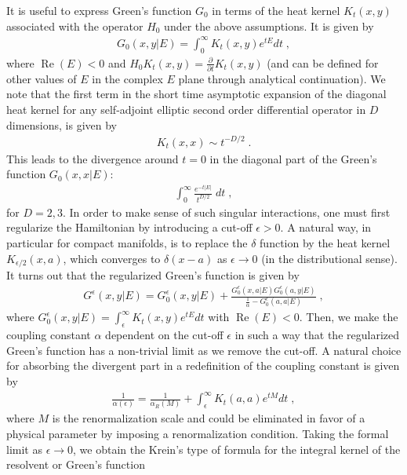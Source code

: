 \documentclass[amsmath,amssymb,14pt]{article}
\numberwithin{equation}{section}
\DeclareMathOperator{\Real}{Re}
\begin{document}
It is useful to express  Green's function $G_0$ in terms of the heat kernel $K_t(x,y)$ associated with the operator $H_0$ under the above assumptions. It is given by 
%
\begin{eqnarray}
    G_0(x,y|E)= \int_{0}^{\infty} K_t(x,y) e^{t E} dt \;, \label{intrepgreen}
\end{eqnarray}
%
where $\Real(E)<0$ and $H_0 K_t(x,y)= \frac{\partial}{\partial t}K_t(x,y)$ (and can be defined for other values of $E$ in the complex $E$ plane through analytical continuation). We note  that the first term in the short time asymptotic expansion of the diagonal heat kernel for any self-adjoint elliptic second order differential operator \cite{Gilkey} in $D$ dimensions, is given by
%
\begin{eqnarray}
 K_t(x,x) \sim  t^{-D/2} \;. \end{eqnarray}
%
This leads to the divergence around $t=0$ in the diagonal part of the Green's function $G_0(x,x|E)$:  
%
\begin{eqnarray}
    \int_{0}^{\infty} \frac{e^{-t|E|}}{t^{D/2}} \; dt \;,
\end{eqnarray}
%
for $D=2,3$. In order to make sense of such singular interactions, one must first regularize the Hamiltonian by introducing a cut-off $\epsilon>0$. A natural way, in particular for compact manifolds, is to replace the $\delta$ function by the heat kernel $K_{\epsilon/2}(x,a)$, which converges to $\delta(x-a)$ as $\epsilon \to 0$ (in the distributional sense). It turns out that the regularized Green's function is given by
%
\begin{eqnarray}
 G^{\epsilon}(x,y|E)= G^{\epsilon}_{0}(x,y|E) + \frac{G^{\epsilon}_{0}(x,a|E) G^{\epsilon}_{0}(a,y|E)}{\frac{1}{\alpha}-G^{\epsilon}_{0}(a,a|E)} \;,    
\end{eqnarray}
%
where $G^{\epsilon}_{0}(x,y|E) = \int_{\epsilon}^{\infty} K_t(x,y)e^{t E} dt$ with $\Real(E)<0$. Then, we make the coupling constant $\alpha$ dependent on the cut-off $\epsilon$ in such a way that the regularized Green's function has a non-trivial limit as we remove the cut-off. A natural choice for absorbing the divergent part in a redefinition of the coupling constant is given by  
%
\begin{eqnarray}
 \frac{1}{\alpha(\epsilon)} = \frac{1}{\alpha_R(M)} + \int_{\epsilon}^{\infty} K_t(a,a) e^{t M} d t \;,
\end{eqnarray}
%
where $M$ is the renormalization scale and could be
eliminated in favor of a physical parameter by imposing a
renormalization condition. Taking the formal limit as $\epsilon \to 0$, we obtain the Krein's type of formula for the integral kernel of the resolvent or Green's function 
\end{document}
